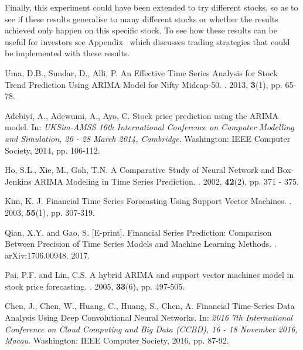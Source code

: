 \documentclass[11pt,a4paper]{article}
\numberwithin{equation}{section}
\begin{document}
Finally, this experiment could have been extended to try different stocks, so as to see if these results generalise to many different stocks or whether the results achieved only happen on this specific stock. To see how these results can be useful for investors see Appendix~ which discusses trading strategies that could be implemented with these results.
\begin{thebibliography}{}
Uma, D.B., Sundar, D., Alli, P.
\newblock An Effective Time Series Analysis for Stock Trend Prediction Using ARIMA Model for Nifty Midcap-50.
. 2013, \textbf{3}(1), pp. 65-78.

Adebiyi, A., Adewumi, A., Ayo, C.
\newblock Stock price prediction using the ARIMA model. In: {\em UKSim-AMSS 16th International Conference on Computer Modelling and Simulation, 26 - 28 March 2014, Cambridge}.
\newblock Washington: IEEE Computer Society, 2014, pp. 106-112.

Ho, S.L., Xie, M., Goh, T.N.
\newblock A Comparative Study of Neural Network and Box-Jenkins ARIMA Modeling in Time Series Prediction.
. 2002, \textbf{42}(2), pp. 371 - 375.

Kim, K. J.
Financial Time Series Forecasting Using Support Vector Machines.
. 2003, \textbf{55}(1), pp. 307-319.

Qian, X.Y. and Gao, S. [E-print].
\newblock Financial Series Prediction: Comparison Between Precision of Time Series Models and Machine Learning Methods.
. arXiv:1706.00948. 2017.

Pai, P.F. and Lin, C.S.
\newblock A hybrid ARIMA and support vector machines model in stock price forecasting.
. 2005, \textbf{33}(6), pp. 497-505.

Chen, J., Chen, W., Huang, C., Huang, S., Chen, A.
\newblock Financial Time-Series Data Analysis Using Deep Convolutional Neural Networks. In: {\em 2016 7th International Conference on Cloud Computing and Big Data (CCBD), 16 - 18 November 2016, Macau}.
\newblock Washington: IEEE Computer Society, 2016, pp. 87-92.


\end{thebibliography}
\end{document}
